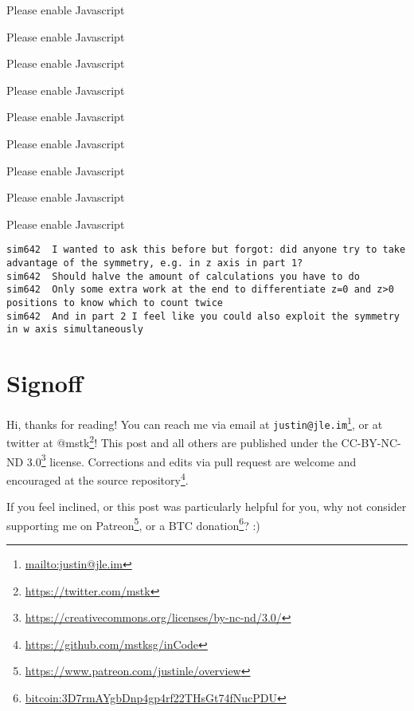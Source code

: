 \documentclass[]{article}
\renewcommand{\href}[2]{#2\footnote{\url{#1}}}
\begin{document}
\leavevmode\hypertarget{golDrawer}{}%
Please enable Javascript

\leavevmode\hypertarget{gol3D}{}%
Please enable Javascript

\leavevmode\hypertarget{gol4D}{}%
Please enable Javascript

\leavevmode\hypertarget{golFlat}{}%
Please enable Javascript

\leavevmode\hypertarget{golSymsForward}{}%
Please enable Javascript

\leavevmode\hypertarget{golSymsReverse}{}%
Please enable Javascript

\leavevmode\hypertarget{golTreeForward}{}%
Please enable Javascript

\leavevmode\hypertarget{golTreeReverse}{}%
Please enable Javascript

\leavevmode\hypertarget{golSyms5D}{}%
Please enable Javascript

\begin{verbatim}
sim642  I wanted to ask this before but forgot: did anyone try to take advantage of the symmetry, e.g. in z axis in part 1?
sim642  Should halve the amount of calculations you have to do
sim642  Only some extra work at the end to differentiate z=0 and z>0 positions to know which to count twice
sim642  And in part 2 I feel like you could also exploit the symmetry in w axis simultaneously
\end{verbatim}

\hypertarget{signoff}{%
\section{Signoff}\label{signoff}}

Hi, thanks for reading! You can reach me via email at
\href{mailto:justin@jle.im}{\nolinkurl{justin@jle.im}}, or at twitter at
\href{https://twitter.com/mstk}{@mstk}! This post and all others are published
under the \href{https://creativecommons.org/licenses/by-nc-nd/3.0/}{CC-BY-NC-ND
3.0} license. Corrections and edits via pull request are welcome and encouraged
at \href{https://github.com/mstksg/inCode}{the source repository}.

If you feel inclined, or this post was particularly helpful for you, why not
consider \href{https://www.patreon.com/justinle/overview}{supporting me on
Patreon}, or a \href{bitcoin:3D7rmAYgbDnp4gp4rf22THsGt74fNucPDU}{BTC donation}?
:)
\end{document}
